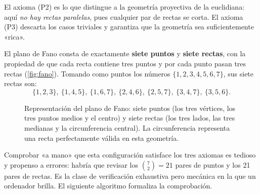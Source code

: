El axioma (P2) es lo que distingue a la geometría proyectiva de la euclidiana: aquí \emph{no hay rectas paralelas},
pues cualquier par de rectas se corta. El axioma (P3) descarta los casos triviales y garantiza que la geometría sea
suficientemente «rica».

El plano de Fano consta de exactamente \textbf{siete puntos} y \textbf{siete rectas}, con la propiedad de que cada
recta contiene tres puntos y por cada punto pasan tres rectas (\autoref{fig:fano}). Tomando como puntos los números
$\{1,2,3,4,5,6,7\}$, sus siete rectas son:
\[
    \{1,2,3\},\ \{1,4,5\},\ \{1,6,7\},\ \{2,4,6\},\ \{2,5,7\},\ \{3,4,7\},\ \{3,5,6\}.
\]

\begin{figure}[h!]
    \centering
    \caption{Representación del plano de Fano: siete puntos (los tres vértices, los tres puntos medios y el centro) y
        siete rectas (los tres lados, las tres medianas y la circunferencia central). La circunferencia representa una
        recta perfectamente válida en esta geometría.}
    \label{fig:fano}
\end{figure}

Comprobar «a mano» que esta configuración satisface los tres axiomas es tedioso y propenso a errores: habría que
revisar los $\binom{7}{2}=21$ pares de puntos y los 21 pares de rectas. Es la clase de verificación exhaustiva pero
mecánica en la que un ordenador brilla. El siguiente algoritmo formaliza la comprobación.

